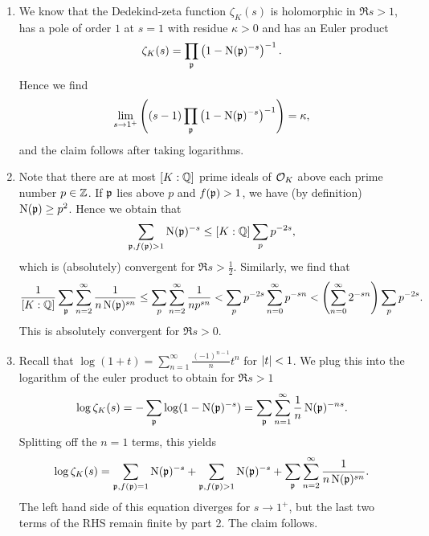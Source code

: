 \documentclass[a4paper,11pt]{article}
\begin{document}
\begin{enumerate}
    \item We know that the Dedekind-zeta function $\zeta_K(s)$ is holomorphic
        in $\Re s >1$, has a pole of order $1$ at $s=1$ with residue $\kappa >0$
        and has an Euler product
        \begin{equation*}
            \zeta_K(s) = \prod_{\mathfrak{p}} \left(1- \operatorname{N}(\mathfrak{p})^{-s}\right)^{-1}.
        \end{equation*}
        Hence we find
        \begin{equation*}
            \lim_{s \to 1^+} \left((s-1) \prod_{\mathfrak{p}} \left(1- \operatorname{N}(\mathfrak{p})^{-s}\right)^{-1} 
                \right)
            = \kappa,
        \end{equation*}
        and the claim follows after taking logarithms.
    \item Note that there are at most $[K:\mathbb{Q}]$ prime ideals of $\mathcal{O}_K$ above
        each prime number $p \in \mathbb{Z}$. If $\mathfrak{p}$ lies above $p$ and $f(\mathfrak{p})>1$,
        we have (by definition) $\operatorname{N}(\mathfrak{p})\geq p^2$. Hence we obtain that 
        \begin{equation*}
            \sum_{\mathfrak{p}, f(\mathfrak{p})>1} \operatorname{N}(\mathfrak{p})^{-s} \leq 
            [K:\mathbb{Q}] \sum_{p} p^{-2s}, 
        \end{equation*}
        which is (absolutely) convergent for $\Re s > \frac 12$. Similarly, we find that 
        \begin{equation*}
            \frac{1}{[K:\mathbb{Q}]} \sum_{\mathfrak{p}} \sum_{n=2}^\infty \frac 1{n \operatorname{N}(\mathfrak{p})^{sn}}
            \leq \sum_p \sum_{n=2}^\infty \frac 1{np^{sn}}
            < \sum_p p^{-2s} \sum_{n=0}^\infty p^{-sn} 
            < \left( \sum_{n=0}^\infty 2^{-sn}\right) \sum_p p^{-2s} .
        \end{equation*}
        This is absolutely convergent for $\Re s > 0$.

    \item Recall that $\log(1+t) = \sum_{n=1}^\infty \frac {(-1)^{n-1}}n t^{n}$ for
        $\left\lvert t \right\rvert < 1$. We plug this
        into the logarithm of the euler product to obtain for $\Re s > 1$
        \begin{equation*}
            \log \zeta_K(s) = -\sum_{\mathfrak{p}} \log(1- \operatorname{N}(\mathfrak{p})^{-s})
            = \sum_{\mathfrak{p}} \sum_{n=1}^\infty \frac 1n \operatorname{N}(\mathfrak{p})^{-ns}.
        \end{equation*}
        Splitting off the $n=1$ terms, this yields
        \begin{equation*}
            \log \zeta_K(s) = \sum_{\mathfrak{p}, f(\mathfrak{p}) = 1} \operatorname{N}(\mathfrak{p})^{-s} 
            + \sum_{\mathfrak{p}, f(\mathfrak{p})>1} \operatorname{N}(\mathfrak{p})^{-s} + 
            \sum_{\mathfrak{p}} \sum_{n=2}^\infty \frac{1}{n \operatorname{N}(\mathfrak{p})^{sn}}.
        \end{equation*}
        The left hand side of this equation diverges for $s \to 1^+$, but the last 
        two terms of the RHS remain finite by part 2. The claim follows.
        
\end{enumerate}

\contactend
\end{document}
